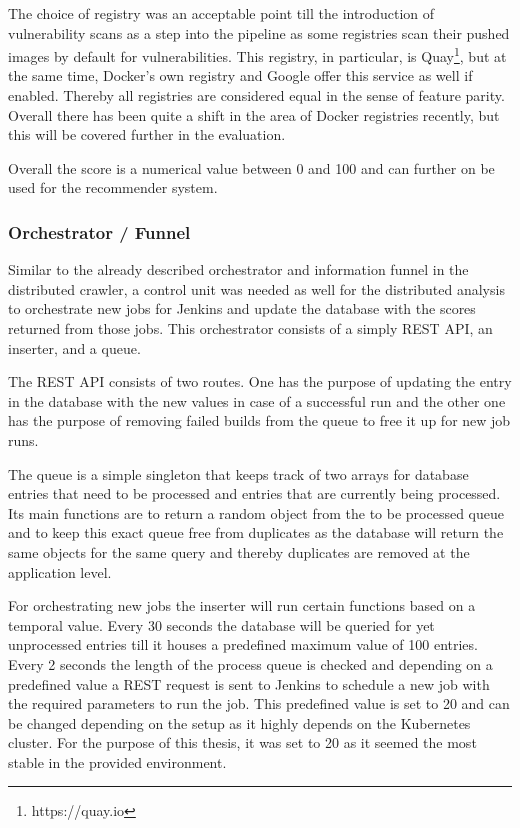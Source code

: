 The choice of registry was an acceptable point till the introduction of vulnerability scans as a step into the pipeline as some registries scan their pushed images by default for vulnerabilities. This registry, in particular, is Quay\footnote{https://quay.io}, but at the same time, Docker's own registry and Google offer this service as well if enabled. Thereby all registries are considered equal in the sense of feature parity. Overall there has been quite a shift in the area of Docker registries recently, but this will be covered further in the evaluation.  

Overall the score is a numerical value between 0 and 100 and can further on be used for the recommender system.

\subsubsection{Orchestrator / Funnel}
Similar to the already described orchestrator and information funnel in the distributed crawler, a control unit was needed as well for the distributed analysis to orchestrate new jobs for Jenkins and update the database with the scores returned from those jobs. This orchestrator consists of a simply REST API, an inserter, and a queue.

The REST API consists of two routes. One has the purpose of updating the entry in the database with the new values in case of a successful run and the other one has the purpose of removing failed builds from the queue to free it up for new job runs.

The queue is a simple singleton that keeps track of two arrays for database entries that need to be processed and entries that are currently being processed. Its main functions are to return a random object from the to be processed queue and to keep this exact queue free from duplicates as the database will return the same objects for the same query and thereby duplicates are removed at the application level.

For orchestrating new jobs the inserter will run certain functions based on a temporal value. Every 30 seconds the database will be queried for yet unprocessed entries till it houses a predefined maximum value of 100 entries. Every 2 seconds the length of the process queue is checked and depending on a predefined value a REST request is sent to Jenkins to schedule a new job with the required parameters to run the job. This predefined value is set to 20 and can be changed depending on the setup as it highly depends on the Kubernetes cluster. For the purpose of this thesis, it was set to 20 as it seemed the most stable in the provided environment.

